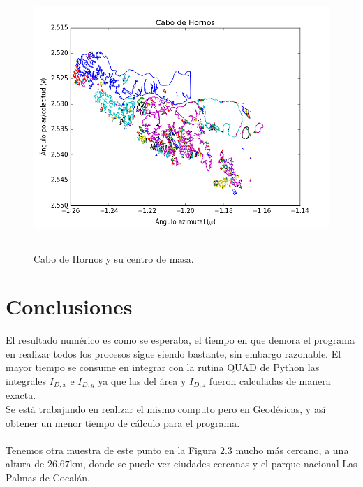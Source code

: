 \documentclass[20pt]{report}
\begin{document}
\begin{itemize}
\begin{figure}[H]
\begin{center}
\label{Label para referencia}
\end{center}
\end{figure}
\begin{figure}[H]
\begin{center}
\includegraphics[width=15cm, height=10cm]{FiguraCentroDeMasaComunal324.png}
\vspace{-0.5cm} %
\caption{Cabo de Hornos y su centro de masa.}
\label{Label para referencia}
\end{center}
\end{figure}
\pagebreak

\section{Conclusiones}
El resultado num\'erico es como se esperaba, el tiempo  en que demora el programa en realizar todos los procesos sigue siendo bastante, sin embargo  razonable. El mayor tiempo se consume en  integrar con la rutina QUAD de Python  las integrales $I_{D,x}$ e $I_{D,y}$ ya que las del \'area y $I_{D,z}$ fueron calculadas de manera exacta.\\

Se est\'a trabajando en  realizar el mismo computo pero en Geod\'esicas, y as\'i obtener un  menor tiempo de c\'alculo para el programa.\\
\\

Tenemos otra  muestra de este punto en la Figura $2.3$  mucho m\'as cercano, a una altura de $26.67$km, donde se puede ver ciudades cercanas y  el parque nacional Las Palmas de Cocal\'an.


\end{itemize}
\end{document}
